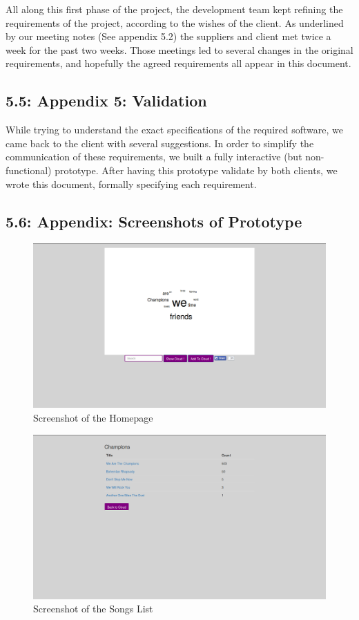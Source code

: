 \documentclass[]{article}
\begin{document}
All along this first phase of the project, the development team kept
refining the requirements of the project, according to the wishes of the
client. As underlined by our meeting notes (See appendix 5.2) the
suppliers and client met twice a week for the past two weeks. Those
meetings led to several changes in the original requirements, and
hopefully the agreed requirements all appear in this document.

\subsection{5.5: Appendix 5: Validation}\label{appendix-5-validation}

While trying to understand the exact specifications of the required
software, we came back to the client with several suggestions. In order
to simplify the communication of these requirements, we built a fully
interactive (but non-functional) prototype. After having this prototype
validate by both clients, we wrote this document, formally specifying
each requirement.

\subsection{5.6: Appendix: Screenshots of
Prototype}\label{appendix-screenshots-of-prototype}

\begin{figure}[htbp]
\centering
\includegraphics{Homepage.png}
\caption{Screenshot of the Homepage}
\end{figure}

\begin{figure}[htbp]
\centering
\includegraphics{SongsList.png}
\caption{Screenshot of the Songs List}
\end{figure}
\end{document}
